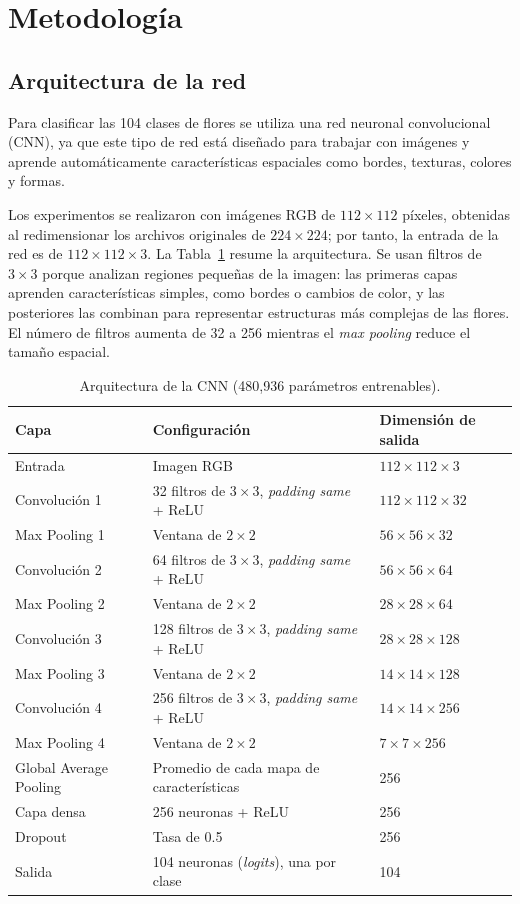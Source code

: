 \section{Metodología}

\subsection{Arquitectura de la red}
Para clasificar las 104 clases de flores se utiliza una red neuronal convolucional (CNN), ya que este tipo de red está diseñado para trabajar con imágenes y aprende automáticamente características espaciales como bordes, texturas, colores y formas.

Los experimentos se realizaron con imágenes RGB de $112\times112$ píxeles, obtenidas al redimensionar los archivos originales de $224\times224$; por tanto, la entrada de la red es de $112\times112\times3$. La Tabla~\ref{tab:arquitectura_cnn} resume la arquitectura. Se usan filtros de $3\times3$ porque analizan regiones pequeñas de la imagen: las primeras capas aprenden características simples, como bordes o cambios de color, y las posteriores las combinan para representar estructuras más complejas de las flores. El número de filtros aumenta de 32 a 256 mientras el \textit{max pooling} reduce el tamaño espacial.

\begin{table}[htbp]
\centering
\caption{Arquitectura de la CNN (480,936 parámetros entrenables).}
\label{tab:arquitectura_cnn}
\small
\begin{tabular}{p{}p{}p{}}
\toprule
Capa & Configuración & Dimensión de salida \\
\midrule
Entrada & Imagen RGB & $112\times112\times3$ \\
Convolución 1 & 32 filtros de $3\times3$, \textit{padding same} + ReLU & $112\times112\times32$ \\
Max Pooling 1 & Ventana de $2\times2$ & $56\times56\times32$ \\
Convolución 2 & 64 filtros de $3\times3$, \textit{padding same} + ReLU & $56\times56\times64$ \\
Max Pooling 2 & Ventana de $2\times2$ & $28\times28\times64$ \\
Convolución 3 & 128 filtros de $3\times3$, \textit{padding same} + ReLU & $28\times28\times128$ \\
Max Pooling 3 & Ventana de $2\times2$ & $14\times14\times128$ \\
Convolución 4 & 256 filtros de $3\times3$, \textit{padding same} + ReLU & $14\times14\times256$ \\
Max Pooling 4 & Ventana de $2\times2$ & $7\times7\times256$ \\
Global Average Pooling & Promedio de cada mapa de características & 256 \\
Capa densa & 256 neuronas + ReLU & 256 \\
Dropout & Tasa de 0.5 & 256 \\
Salida & 104 neuronas (\textit{logits}), una por clase & 104 \\
\bottomrule
\end{tabular}
\end{table}

